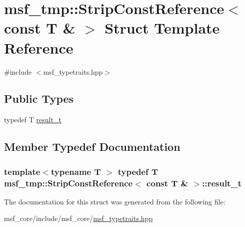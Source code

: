 \hypertarget{structmsf__tmp_1_1StripConstReference_3_01const_01T_01_6_01_4}{\section{msf\-\_\-tmp\-:\-:Strip\-Const\-Reference$<$ const T \& $>$ Struct Template Reference}
\label{structmsf__tmp_1_1StripConstReference_3_01const_01T_01_6_01_4}
}


{\ttfamily \#include $<$msf\-\_\-typetraits.\-hpp$>$}

\subsection*{Public Types}
\begin{DoxyCompactItemize}
\item 
typedef T \hyperlink{structmsf__tmp_1_1StripConstReference_3_01const_01T_01_6_01_4_a2535057bb12b6b644caf7a8e2b4059c6}{result\-\_\-t}
\end{DoxyCompactItemize}


\subsection{Member Typedef Documentation}
\hypertarget{structmsf__tmp_1_1StripConstReference_3_01const_01T_01_6_01_4_a2535057bb12b6b644caf7a8e2b4059c6}{
\subsubsection[{result\-\_\-t}]{\setlength{\rightskip}{0pt plus 5cm}template$<$typename T $>$ typedef T {\bf msf\-\_\-tmp\-::\-Strip\-Const\-Reference}$<$ const T \& $>$\-::{\bf result\-\_\-t}}}\label{structmsf__tmp_1_1StripConstReference_3_01const_01T_01_6_01_4_a2535057bb12b6b644caf7a8e2b4059c6}


The documentation for this struct was generated from the following file\-:\begin{DoxyCompactItemize}
\item 
msf\-\_\-core/include/msf\-\_\-core/\hyperlink{msf__typetraits_8hpp}{msf\-\_\-typetraits.\-hpp}\end{DoxyCompactItemize}
